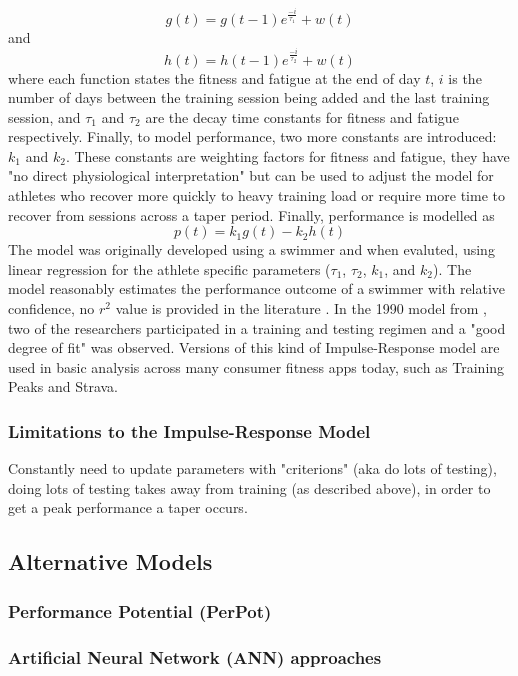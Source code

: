 \begin{equation}\label{eq:ban_fit}
  g(t) = g(t - 1)e^\frac{-i}{\tau_1} + w(t)
\end{equation}
and
\begin{equation}\label{eq:ban_fat}
  h(t) = h(t - 1)e^\frac{-i}{\tau_2} + w(t)
\end{equation}
where each function states the fitness and fatigue at the end of day $t$, $i$ is the number of days between the training session being added and the last training session, and $\tau_1$ and $\tau_2$ are the decay time constants for fitness and fatigue respectively. Finally, to model performance, two more constants are introduced: $k_1$ and $k_2$. These constants are weighting factors for fitness and fatigue, they have "no direct physiological interpretation" but can be used to adjust the model for athletes who recover more quickly to heavy training load or require more time to recover from sessions across a taper period. Finally, performance is modelled as
\begin{equation}\label{eq:ban_perf}
  p(t) = k_1g(t)-k_2h(t)
\end{equation}
The model was originally developed using a swimmer and when evaluted, using linear regression for the athlete specific parameters ($\tau_1$, $\tau_2$, $k_1$, and $k_2$). The model reasonably estimates the performance outcome of a swimmer with relative confidence, no $r^2$ value is provided in the literature \cite{Bannister1976}. In the 1990 model from \textcite{Morton1990}, two of the researchers participated in a training and testing regimen and a "good degree of fit" was observed. Versions of this kind of Impulse-Response model are used in basic analysis across many consumer fitness apps today, such as Training Peaks and Strava.

\subsubsection{Limitations to the Impulse-Response Model}
Constantly need to update parameters with "criterions" (aka do lots of testing), doing lots of testing takes away from training (as described above), in order to get a peak performance a taper occurs.

\subsection{Alternative Models}
\subsubsection{Performance Potential (PerPot)}
\subsubsection{Artificial Neural Network (ANN) approaches}
